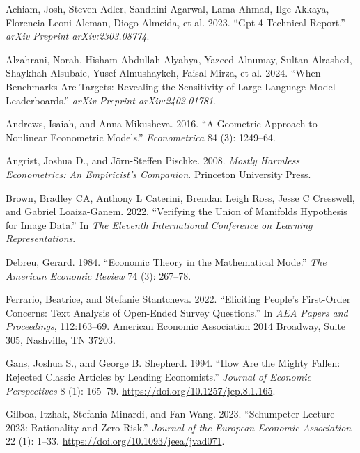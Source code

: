\documentclass[
]{article}
\newlength{\cslhangindent}
\newlength{\cslentryspacingunit} %
\newenvironment{CSLReferences}[2] %
 {%
  \setlength{\parindent}{0pt}
  \ifodd #1
  \let\oldpar\par
  \def\par{\hangindent=\cslhangindent\oldpar}
  \fi
  \setlength{\parskip}{#2\cslentryspacingunit}
 }%
 {}
\begin{document}
\hypertarget{refs}{}
\begin{CSLReferences}{1}{0}
\leavevmode{}%
Achiam, Josh, Steven Adler, Sandhini Agarwal, Lama Ahmad, Ilge Akkaya,
Florencia Leoni Aleman, Diogo Almeida, et al. 2023. {``Gpt-4 Technical
Report.''} \emph{arXiv Preprint arXiv:2303.08774}.

\leavevmode{}%
Alzahrani, Norah, Hisham Abdullah Alyahya, Yazeed Alnumay, Sultan
Alrashed, Shaykhah Alsubaie, Yusef Almushaykeh, Faisal Mirza, et al.
2024. {``When Benchmarks Are Targets: Revealing the Sensitivity of Large
Language Model Leaderboards.''} \emph{arXiv Preprint arXiv:2402.01781}.

\leavevmode{}%
Andrews, Isaiah, and Anna Mikusheva. 2016. {``A Geometric Approach to
Nonlinear Econometric Models.''} \emph{Econometrica} 84 (3): 1249--64.

\leavevmode{}%
Angrist, Joshua D., and Jörn-Steffen Pischke. 2008. \emph{Mostly
Harmless Econometrics: An Empiricist's Companion}. Princeton University
Press.

\leavevmode{}%
Brown, Bradley CA, Anthony L Caterini, Brendan Leigh Ross, Jesse C
Cresswell, and Gabriel Loaiza-Ganem. 2022. {``Verifying the Union of
Manifolds Hypothesis for Image Data.''} In \emph{The Eleventh
International Conference on Learning Representations}.

\leavevmode{}%
Debreu, Gerard. 1984. {``Economic Theory in the Mathematical Mode.''}
\emph{The American Economic Review} 74 (3): 267--78.

\leavevmode{}%
Ferrario, Beatrice, and Stefanie Stantcheva. 2022. {``Eliciting People's
First-Order Concerns: Text Analysis of Open-Ended Survey Questions.''}
In \emph{AEA Papers and Proceedings}, 112:163--69. American Economic
Association 2014 Broadway, Suite 305, Nashville, TN 37203.

\leavevmode{}%
Gans, Joshua S., and George B. Shepherd. 1994. {``How Are the Mighty
Fallen: Rejected Classic Articles by Leading Economists.''}
\emph{Journal of Economic Perspectives} 8 (1): 165--79.
\url{https://doi.org/10.1257/jep.8.1.165}.

\leavevmode{}%
Gilboa, Itzhak, Stefania Minardi, and Fan Wang. 2023. {``{Schumpeter
Lecture 2023: Rationality and Zero Risk}.''} \emph{Journal of the
European Economic Association} 22 (1): 1--33.
\url{https://doi.org/10.1093/jeea/jvad071}.


\end{CSLReferences}
\end{document}

